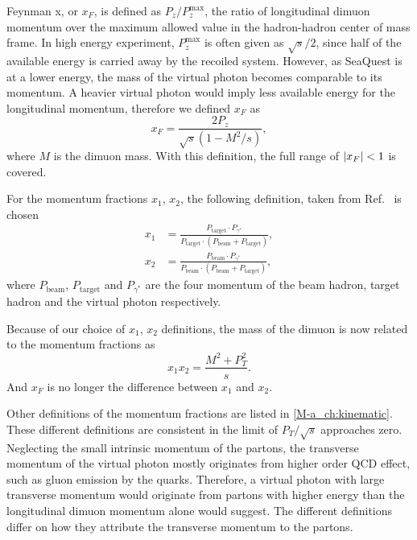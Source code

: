 \documentclass[../main.tex]{subfiles}
\begin{document}
Feynman x, or $x_F$, is defined as $P_z/P_z^{\mathrm{max}}$, the ratio of longitudinal dimuon momentum
over the maximum allowed value in the hadron-hadron center of mass frame. In high energy
experiment, $P_z^{\mathrm{max}}$ is often given as $\sqrt{s}/2$, since half of the available energy is
carried away by the recoiled system.
However, as SeaQuest is at a lower energy, the mass of the virtual photon becomes comparable to its momentum.
A heavier virtual photon would imply less available energy for the longitudinal momentum,
therefore we defined $x_F$ as
\begin{equation}
	x_F = \frac{2P_z}{\sqrt{s}\left(1-M^2/s\right)},
\end{equation}
where $M$ is the dimuon mass. With this definition, the full range of $\abs{x_F}<1$ is covered.

For the momentum fractions $x_1$, $x_2$, the following definition, taken from Ref.~\cite{Coester-1286} is chosen
\begin{equation}
	\begin{split}
		x_1 & = \frac{P_{\textrm{target}}\cdot P_{\gamma^*}}{P_{\textrm{target}}\cdot (P_{\textrm{beam}}+P_{\textrm{target}})}, \\
		x_2 & = \frac{P_{\textrm{beam}}\cdot P_{\gamma^*}}{P_{\textrm{beam}}\cdot (P_{\textrm{beam}}+P_{\textrm{target}})},
	\end{split}
\end{equation}
where $P_{\textrm{beam}}$, $P_{\textrm{target}}$ and $P_{\gamma^*}$ are the four momentum of the
beam hadron, target hadron and the virtual photon respectively.

Because of our choice of $x_1$, $x_2$ definitions, the mass of the dimuon is now related to
the momentum fractions as
\begin{equation}
	x_1x_2= \frac{M^2+P_T^2}{s}.
\end{equation}
And $x_F$ is no longer the difference between $x_1$ and $x_2$.

Other definitions of the momentum fractions are listed in \cref{M-a_ch:kinematic}. These different definitions
are consistent in the limit of $P_T/\sqrt{s}$ approaches zero.
Neglecting the small intrinsic momentum of the partons,
the transverse momentum of the virtual photon mostly originates from higher order QCD effect, such as gluon
emission by the quarks. Therefore, a virtual photon with large transverse momentum would originate
from partons with higher energy than the longitudinal dimuon momentum alone would suggest. The different
definitions differ on how they attribute the transverse momentum to the partons.
\end{document}
